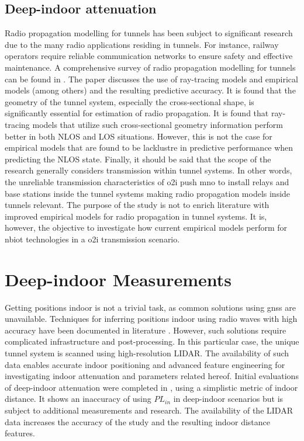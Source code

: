 \subsection{Deep-indoor attenuation}
Radio propagation modelling for tunnels has been subject to significant research due to the many radio applications residing in tunnels. For instance, railway operators require reliable communication networks to ensure safety and effective maintenance. A comprehensive survey of radio propagation modelling for tunnels can be found in \cite{Hrovat2014ATunnels}. The paper discusses the use of ray-tracing models and empirical models (among others) and the resulting predictive accuracy. It is found that the geometry of the tunnel system, especially the cross-sectional shape, is significantly essential for estimation of radio propagation. It is found that ray-tracing models that utilize such cross-sectional geometry information perform better in both NLOS and LOS situations. However, this is not the case for empirical models that are found to be lacklustre in predictive performance when predicting the NLOS state. Finally, it should be said that the scope of the research generally considers transmission within tunnel systems. In other words, the unreliable transmission characteristics of \gls{o2i} push \acrlong{mno} to install relays and base stations inside the tunnel systems making radio propagation models inside tunnels relevant. The purpose of the study is not to enrich literature with improved empirical models for radio propagation in tunnel systems. It is, however, the objective to investigate how current empirical models perform for \gls{nbiot} technologies in a \gls{o2i} transmission scenario.

\section{Deep-indoor Measurements}
Getting positions indoor is not a trivial task, as common solutions using \gls{gnss} are unavailable. Techniques for inferring positions indoor using radio waves with high accuracy have been documented in literature \cite{Nuaimi2011}. However, such solutions require complicated infrastructure and post-processing. In this particular case, the unique tunnel system is scanned using high-resolution LIDAR. The availability of such data enables accurate indoor positioning and advanced feature engineering for investigating indoor attenuation and parameters related hereof.  Initial evaluations of deep-indoor attenuation were completed in \cite{Malarski2019InvestigationAttenuation}, using a simplistic metric of indoor distance. It shows an inaccuracy of using $PL_{in}$ in deep-indoor scenarios but is subject to additional measurements and research. The availability of the LIDAR data increases the accuracy of the study and the resulting indoor distance features. 


